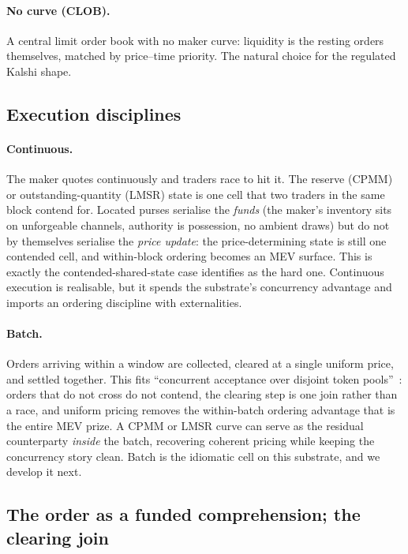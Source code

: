 \documentclass[11pt]{article}
\begin{document}
\paragraph{No curve (CLOB).} A central limit order book with no maker curve: liquidity is the
resting orders themselves, matched by price--time priority. The natural choice for the
regulated Kalshi shape.

\subsection{Execution disciplines}

\paragraph{Continuous.} The maker quotes continuously and traders race to hit it. The reserve
(CPMM) or outstanding-quantity (LMSR) state is one cell that two traders in the same block
contend for. Located purses serialise the \emph{funds} (the maker's inventory sits on
unforgeable channels, authority is possession, no ambient draws) but do not by themselves
serialise the \emph{price update}: the price-determining state is still one contended cell, and
within-block ordering becomes an MEV surface. This is exactly the contended-shared-state case
\cite[\S7]{finrho} identifies as the hard one. Continuous execution is realisable, but it
spends the substrate's concurrency advantage and imports an ordering discipline with
externalities.

\paragraph{Batch.} Orders arriving within a window are collected, cleared at a single uniform
price, and settled together. This fits ``concurrent acceptance over disjoint token
pools''~\cite[\S7]{finrho}: orders that do not cross do not contend, the clearing step is one
join rather than a race, and uniform pricing removes the within-batch ordering advantage that
is the entire MEV prize. A CPMM or LMSR curve can serve as the residual counterparty
\emph{inside} the batch, recovering coherent pricing while keeping the concurrency story clean.
Batch is the idiomatic cell on this substrate, and we develop it next.

\subsection{The order as a funded comprehension; the clearing join}
\end{document}
